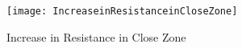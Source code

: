\begin{figure}[!htbp]
    \centering
    \texttt{[image: IncreaseinResistanceinCloseZone]}
    \caption{Increase in Resistance in Close Zone}
    \label{fig:Increase in Resistance in Close Zone}
\end{figure}
%
%    
%    

